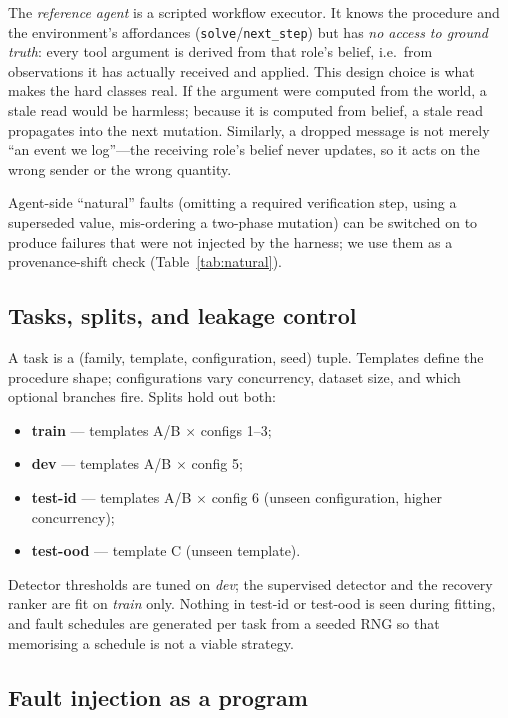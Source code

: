 The \emph{reference agent} is a scripted workflow executor. It knows the procedure and the
environment's affordances (\texttt{solve}/\texttt{next\_step}) but has \emph{no access to ground
truth}: every tool argument is derived from that role's belief, i.e.\ from observations it has
actually received and applied. This design choice is what makes the hard classes real. If the
argument were computed from the world, a stale read would be harmless; because it is computed from
belief, a stale read propagates into the next mutation. Similarly, a dropped message is not merely
``an event we log''---the receiving role's belief never updates, so it acts on the wrong sender or
the wrong quantity.

Agent-side ``natural'' faults (omitting a required verification step, using a superseded value,
mis-ordering a two-phase mutation) can be switched on to produce failures that were not injected by
the harness; we use them as a provenance-shift check (Table~\ref{tab:natural}).

\subsection{Tasks, splits, and leakage control}

A task is a (family, template, configuration, seed) tuple. Templates define the procedure shape;
configurations vary concurrency, dataset size, and which optional branches fire. Splits hold out
both:

\begin{itemize}
\item \textbf{train} --- templates A/B $\times$ configs 1--3;
\item \textbf{dev} --- templates A/B $\times$ config 5;
\item \textbf{test-id} --- templates A/B $\times$ config 6 (unseen configuration, higher concurrency);
\item \textbf{test-ood} --- template C (unseen template).
\end{itemize}

Detector thresholds are tuned on \emph{dev}; the supervised detector and the recovery ranker are fit
on \emph{train} only. Nothing in test-id or test-ood is seen during fitting, and fault schedules are
generated per task from a seeded RNG so that memorising a schedule is not a viable strategy.

\subsection{Fault injection as a program}

